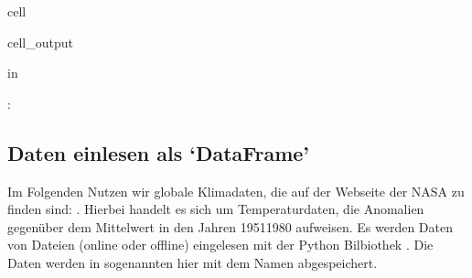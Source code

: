 \documentclass[letterpaper,10pt,english]{jupyterBook}
\begin{document}
\begin{sphinxuseclass}{cell}
\begin{sphinxVerbatimOutput}
\begin{sphinxuseclass}{cell_output}
\begin{sphinxVerbatim}[commandchars=\\\{\}]
   
    
  
    
    
   \PYG{p}{[}\PYG{p}{]}

 in 

: 
\end{sphinxVerbatim}

\end{sphinxuseclass}\end{sphinxVerbatimOutput}

\end{sphinxuseclass}

\subsection{Daten einlesen als ‘DataFrame’}
\label{\detokenize{content/1_APy_Plotten:daten-einlesen-als-dataframe}}
\sphinxAtStartPar
Im Folgenden Nutzen wir globale Klimadaten, die auf der Webseite der NASA zu finden sind: . Hierbei handelt es sich um Temperaturdaten, die Anomalien gegenüber dem Mittelwert in den Jahren 1951\sphinxhyphen{}1980 aufweisen.
Es werden Daten von Dateien (online oder offline) eingelesen mit der Python Bilbiothek . Die Daten werden in sogenannten  hier mit dem Namen  abgespeichert.
\end{document}
